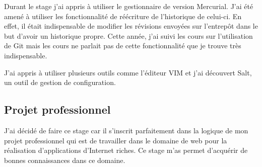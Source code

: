 Durant le stage j'ai appris à utiliser le gestionnaire de version Mercurial.
J'ai été amené à utiliser les fonctionnalité de réécriture de l'historique de
celui-ci. En effet, il était indispensable de modifier les révisions envoyées
sur l'entrepôt dans le but d'avoir un historique propre. Cette année, j'ai
suivi les cours sur l'utilisation de Git mais les cours ne parlait pas de cette
fonctionnalité que je trouve très indispensable. 

J'ai appris à utiliser plusieurs outils comme l'éditeur VIM et j'ai découvert
Salt, un outil de gestion de configuration.  \subsection{Projet professionnel}
J'ai décidé de faire ce stage car il s'inscrit parfaitement dans la logique de
mon projet professionnel qui est de travailler dans le domaine de web pour la
réalisation d'applications d'Internet riches. Ce stage m'as permet d'acquérir
de bonnes connaissances dans ce domaine.  
